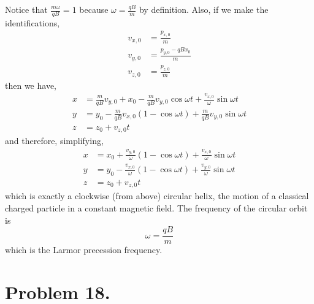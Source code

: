 \documentclass[12pt]{extarticle}
\begin{document}
Notice that $\frac{m \omega}{qB} = 1$ because $\omega = \frac{qB}{m}$ by definition. Also, if we make the identifications, 
\begin{align*}
v_{x,0} & = \frac{p_{x,0}}{m} \\
v_{y,0} & = \frac{p_{y,0} - qB x_0}{m} \\
v_{z,0} & = \frac{p_{z,0}}{m}
\end{align*}
then we have,
\begin{align*}
x & =  \frac{m}{qB} v_{y,0} + x_0 - \frac{m}{qB} v_{y,0} \cos{\omega t} + \frac{v_{x, 0}}{ \omega} \sin{\omega t} \\
y & = y_0 - \frac{m}{qB} v_{x, 0}(1 - \cos{\omega t}) + \frac{m}{qB} v_{y,0} \sin{\omega t} \\
z & = z_0 + v_{z,0} t
\end{align*}
and therefore, simplifying, 
\begin{align*}
x & =  x_0  + \frac{v_{y,0}}{\omega}(1 - \cos{\omega t}) + \frac{v_{x, 0}}{ \omega} \sin{\omega t} \\
y & = y_0 - \frac{v_{x, 0}}{\omega} (1 - \cos{\omega t}) + \frac{v_{y,0}}{\omega} \sin{\omega t} \\
z & = z_0 + v_{z,0} t
\end{align*}
which is exactly a clockwise (from above) circular helix, the motion of a classical charged particle in a constant magnetic field. The frequency of the circular orbit is \[\omega = \frac{qB}{m}\]
which is the Larmor precession frequency. 

\section*{Problem 18.}
\end{document}
